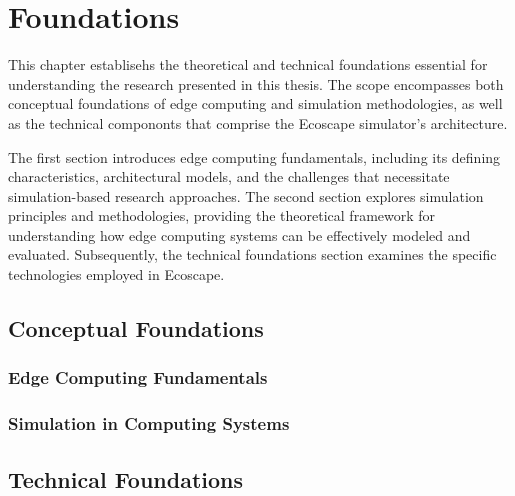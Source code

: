 \chapter{Foundations}
This chapter establisehs the theoretical and technical foundations essential for understanding the research presented in this thesis.
The scope encompasses both conceptual foundations of edge computing and simulation methodologies, as well as the technical compononts that comprise the Ecoscape simulator's architecture.

The first section introduces edge computing fundamentals, including its defining characteristics, architectural models, and the challenges that necessitate simulation-based research approaches.
The second section explores simulation principles and methodologies, providing the theoretical framework for understanding how edge computing systems can be effectively modeled and evaluated.
Subsequently, the technical foundations section examines the specific technologies employed in Ecoscape.
\section{Conceptual Foundations}
\subsection{Edge Computing Fundamentals}
\subsection{Simulation in Computing Systems}
\section{Technical Foundations}
